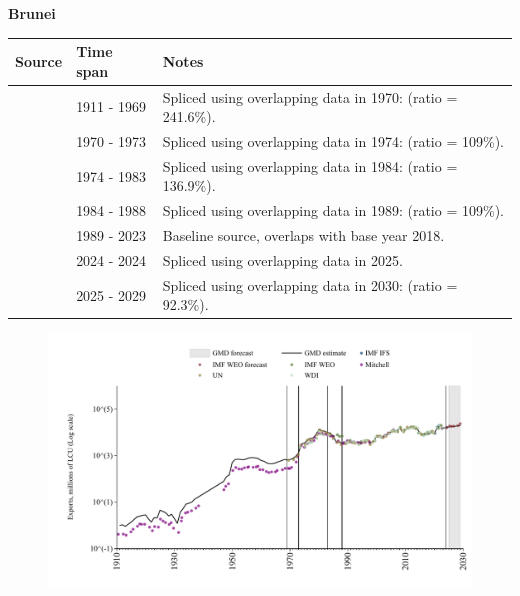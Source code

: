 \documentclass[12pt,a4paper,landscape]{article}
\begin{document}
\begin{adjustbox}{max totalsize={\paperwidth}{\paperheight},center}
\begin{minipage}[t][\textheight][t]{\textwidth}
\vspace*{0.5cm}
{}
\begin{center}
{\Large\bfseries Brunei}
\end{center}
\vspace{0.5cm}
\begin{table}[H]
\centering
\small
\begin{tabular}{|l|l|l|}
\hline
\textbf{Source} & \textbf{Time span} & \textbf{Notes} \\
\hline
\rowcolor{white}\cite{Mitchell}& 1911 - 1969 &Spliced using overlapping data in 1970: (ratio = 241.6\%).\\
\rowcolor{lightgray}\cite{UN}& 1970 - 1973 &Spliced using overlapping data in 1974: (ratio = 109\%).\\
\rowcolor{white}\cite{WDI}& 1974 - 1983 &Spliced using overlapping data in 1984: (ratio = 136.9\%).\\
\rowcolor{lightgray}\cite{UN}& 1984 - 1988 &Spliced using overlapping data in 1989: (ratio = 109\%).\\
\rowcolor{white}\cite{WDI}& 1989 - 2023 &Baseline source, overlaps with base year 2018.\\
\rowcolor{lightgray}\cite{IMF_IFS}& 2024 - 2024 &Spliced using overlapping data in 2025.\\
\rowcolor{white}\cite{IMF_WEO_forecast}& 2025 - 2029 &Spliced using overlapping data in 2030: (ratio = 92.3\%).\\
\hline
\end{tabular}
\end{table}
\begin{figure}[H]
\centering
\includegraphics[width=\textwidth,height=0.6\textheight,keepaspectratio]{graphs/BRN_exports.pdf}
\end{figure}
\end{minipage}
\end{adjustbox}
\end{document}
